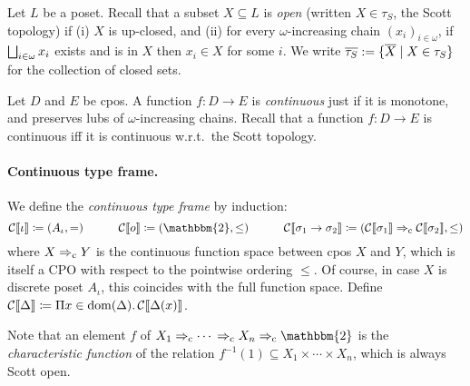 Let $L$ be a poset. 
Recall that a subset $X \subseteq L$ is \emph{open} (written $X \in \tau_S$, the Scott topology) if (i) $X$ is up-closed, and (ii) for every $\omega$-increasing chain $(x_i)_{i \in \omega}$, if $\bigsqcup_{i \in \omega} x_i$ exists and is in $X$ then $x_i \in X$ for some $i$. 
We write $\overline{\tau_S} := \{\overline X \mid X \in \tau_S\}$ for the collection of closed sets.


Let $D$ and $E$ be cpos. 
A function $f:D \to E$ is \emph{continuous} just if it is monotone, and preserves lubs of $\omega$-increasing chains.
Recall that a function $f : D \to E$ is continuous iff it is continuous w.r.t.~the Scott topology.

\paragraph{Continuous type frame.}
We define the \emph{continuous type frame} by induction:
\[
   \cmng{\iota} \coloneqq (A_\iota, =)
   \qquad\quad \cmng{\boolsort} \coloneqq (\mathbbm{2}, \leq)
   \qquad\quad \cmng{\sigma_1 \to \sigma_2} \coloneqq (\cmng{\sigma_1} \cTo \cmng{\sigma_2}, \leq)
\]
where $X \Rightarrow_{\rm c} Y$ is the continuous function space between cpos $X$ and $Y$, which is itself a CPO with respect to the pointwise ordering $\leq$.
Of course, in case $X$ is discrete poset $A_\iota$, this coincides with the full function space.
Define $\mathcal{C}\llbracket \Delta \rrbracket \coloneqq \Pi x \in \mathrm{dom}(\Delta).\,\mathcal{C}\llbracket \Delta(x) \rrbracket$.

Note that an element $f$ of $X_1 \cTo \cdots{} \cTo X_n \cTo \mathbbm{2}$ is the \emph{characteristic function} of the relation $f^{-1}(1) \subseteq X_1 \times \cdots \times X_n$, which is always Scott open.


